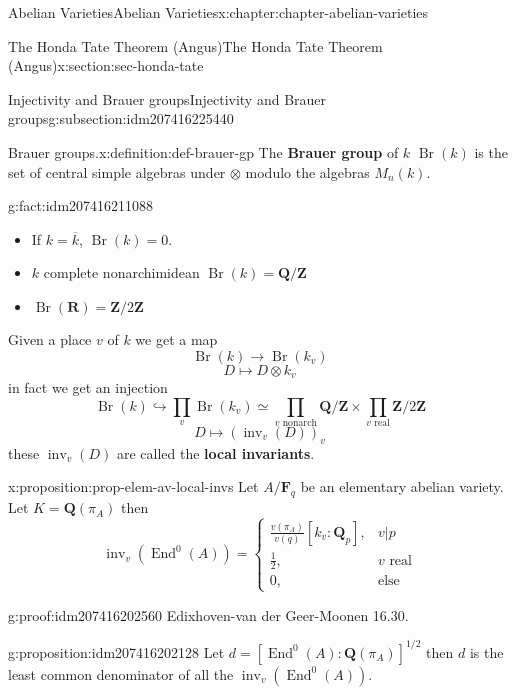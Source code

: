 \documentclass[oneside,10pt,]{book}
\newcommand{\terminology}[1]{\textbf{#1}}
\numberwithin{equation}{section}
\newcommand{\lb}{[}
\newcommand{\rb}{]}
\newcommand{\ZZ}{\mathbf{Z}}
\newcommand{\QQ}{\mathbf{Q}}
\newcommand{\RR}{\mathbf{R}}
\newcommand{\FF}{\mathbf{F}}
\DeclareMathOperator{\End}{End}
\newcommand{\amp}{&}
\begin{document}
\begin{chapterptx}{Abelian Varieties}{}{Abelian Varieties}{}{}{x:chapter:chapter-abelian-varieties}
\begin{sectionptx}{The Honda Tate Theorem (Angus)}{}{The Honda Tate Theorem (Angus)}{}{}{x:section:sec-honda-tate}
\begin{subsectionptx}{Injectivity and Brauer groups}{}{Injectivity and Brauer groups}{}{}{g:subsection:idm207416225440}
\begin{definition}{Brauer groups.}{x:definition:def-brauer-gp}
The \terminology{Brauer group} of \(k\) \(\operatorname{Br}(k)\) is the set of central simple algebras under \(\otimes\) modulo the algebras \(M_n(k)\).%
\end{definition}
\begin{fact}{}{}{g:fact:idm207416211088}%
%
\begin{itemize}[label=\textbullet]
\item{}If \(k = \overline k\), \(\operatorname{Br}(k) = 0\).%
\item{}\(k\) complete nonarchimidean \(\operatorname{Br}(k) = \QQ/\ZZ\)%
\item{}\(\operatorname{Br}(\RR) = \ZZ/2\ZZ\)%
\end{itemize}
Given a place \(v\) of \(k\) we get a map%
\begin{equation*}
\operatorname{Br}(k) \to \operatorname{Br}(k_v)
\end{equation*}
%
\begin{equation*}
D \mapsto D\otimes k_v
\end{equation*}
in fact we get an injection%
\begin{equation*}
\operatorname{Br}(k) \hookrightarrow \prod_v \operatorname{Br}(k_v) \simeq \prod_{v\text{ nonarch}} \QQ/\ZZ \times \prod_{v\text{ real}} \ZZ/2\ZZ
\end{equation*}
%
\begin{equation*}
D\mapsto (\operatorname{inv}_v(D))_v
\end{equation*}
these \(\operatorname{inv}_v(D)\) are called the \terminology{local invariants}.%
\end{fact}
\begin{proposition}{}{}{x:proposition:prop-elem-av-local-invs}%
Let \(A/\FF_q\) be an elementary abelian variety. Let \(K = \QQ(\pi_A)\) then%
\begin{equation*}
\operatorname{inv}_v(\End^0(A)) = \begin{cases} \frac{v(\pi_A)}{v(q)} [k_v: \QQ_p], \amp v|p\\ \frac 12,\amp v\text{ real}\\ 0, \amp \text{else}\end{cases}
\end{equation*}
%
\end{proposition}
\begin{proofptx}{}{g:proof:idm207416202560}
Edixhoven-van der Geer-Moonen 16.30.%
\end{proofptx}
\begin{proposition}{}{}{g:proposition:idm207416202128}%
Let \(d= \lb \End^0(A) : \QQ(\pi_A) \rb^{1/2}\) then \(d\) is the least common denominator of all the \(\operatorname{inv}_v(\End^0(A))\).%

\end{proposition}
\end{subsectionptx}
\end{sectionptx}
\end{chapterptx}
\end{document}
